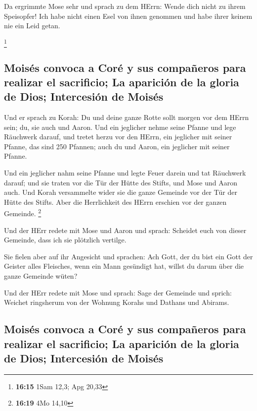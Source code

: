  Da ergrimmte Mose sehr und sprach zu dem HErrn: Wende
dich nicht zu ihrem Speisopfer! Ich habe nicht einen Esel von ihnen
genommen und habe ihrer keinem nie ein Leid getan.

\footnote{\textbf{16:15} 1Sam 12,3; Apg 20,33}

\hypertarget{moisuxe9s-convoca-a-coruxe9-y-sus-compauxf1eros-para-realizar-el-sacrificio-la-apariciuxf3n-de-la-gloria-de-dios-intercesiuxf3n-de-moisuxe9s}{%
\subsection{Moisés convoca a Coré y sus compañeros para realizar el
sacrificio; La aparición de la gloria de Dios; Intercesión de
Moisés}\label{moisuxe9s-convoca-a-coruxe9-y-sus-compauxf1eros-para-realizar-el-sacrificio-la-apariciuxf3n-de-la-gloria-de-dios-intercesiuxf3n-de-moisuxe9s}}

 Und er sprach zu Korah: Du und deine ganze Rotte sollt
morgen vor dem HErrn sein; du, sie auch und Aaron.  Und
ein jeglicher nehme seine Pfanne und lege Räuchwerk darauf, und tretet
herzu vor den HErrn, ein jeglicher mit seiner Pfanne, das sind 250
Pfannen; auch du und Aaron, ein jeglicher mit seiner Pfanne.

 Und ein jeglicher nahm seine Pfanne und legte Feuer
darein und tat Räuchwerk darauf; und sie traten vor die Tür der Hütte
des Stifts, und Mose und Aaron auch.  Und Korah
versammelte wider sie die ganze Gemeinde vor der Tür der Hütte des
Stifts. Aber die Herrlichkeit des HErrn erschien vor der ganzen
Gemeinde. \footnote{\textbf{16:19} 4Mo 14,10}

 Und der HErr redete mit Mose und Aaron und sprach:
 Scheidet euch von dieser Gemeinde, dass ich sie
plötzlich vertilge.

 Sie fielen aber auf ihr Angesicht und sprachen: Ach
Gott, der du bist ein Gott der Geister alles Fleisches, wenn ein Mann
gesündigt hat, willst du darum über die ganze Gemeinde wüten?

 Und der HErr redete mit Mose und sprach: 
Sage der Gemeinde und sprich: Weichet ringsherum von der Wohnung Korahs
und Dathans und Abirams.

\hypertarget{moisuxe9s-convoca-a-coruxe9-y-sus-compauxf1eros-para-realizar-el-sacrificio-la-apariciuxf3n-de-la-gloria-de-dios-intercesiuxf3n-de-moisuxe9s-1}{%
\subsection{Moisés convoca a Coré y sus compañeros para realizar el
sacrificio; La aparición de la gloria de Dios; Intercesión de
Moisés}\label{moisuxe9s-convoca-a-coruxe9-y-sus-compauxf1eros-para-realizar-el-sacrificio-la-apariciuxf3n-de-la-gloria-de-dios-intercesiuxf3n-de-moisuxe9s-1}}

